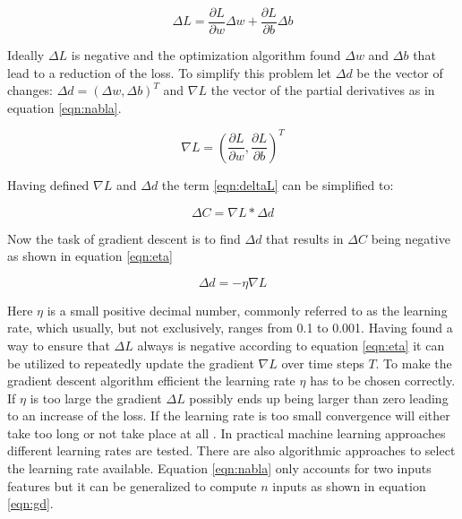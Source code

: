 \begin{equation}
  \Delta L = \frac{\partial L}{\partial w} \Delta w + \frac{\partial L}{\partial b} \Delta b
\label{eqn:deltaL} 
\end{equation}

Ideally $\Delta L$ is negative and the optimization algorithm found $\Delta w$ and
$\Delta b$ that lead to a reduction of the loss. To simplify this problem let $\Delta d$
be the vector of changes: $\Delta d = (\Delta w , \Delta b)^T $ and $\nabla L$ the vector
of the partial derivatives as in equation \ref{eqn:nabla}.


\begin{equation}
 \nabla L = \left(\frac{\partial L}{\partial w}, \frac{\partial L}{\partial b}\right)^T
\label{eqn:nabla}
\end{equation}

Having defined $\nabla L$ and $\Delta d$ the term \ref{eqn:deltaL} can be simplified to:

\begin{equation}
\Delta C = \nabla L * \Delta d
 \label{eqn:cd}
\end{equation}

Now the task of gradient descent is to find $\Delta d$ that results in $\Delta C$ being negative as
shown in equation \ref{eqn:eta}

\begin{equation}
 \Delta d = -\eta \nabla L
 \label{eqn:eta}
\end{equation}

Here $\eta$ is a small positive decimal number, commonly referred to as the learning rate,
which usually, but not exclusively, ranges from 0.1 to 0.001.  Having found a way to
ensure that $\Delta L$ always is negative according to equation \ref{eqn:eta} it can be
utilized to repeatedly update the gradient $\nabla L$ over time steps $T$. To make the
gradient descent algorithm efficient the learning rate $\eta$ has to be chosen
correctly. If $\eta$ is too large the gradient $\Delta L$ possibly ends up being larger
than zero leading to an increase of the loss. If the learning rate is too small
convergence will either take too long or not take place at all
\cite{bergstra2011algorithms}. In practical machine learning approaches different learning
rates are tested. There are also algorithmic approaches to select the learning rate
available. Equation \ref{eqn:nabla} only accounts for two inputs features but it can be
generalized to compute $n$ inputs as shown in equation \ref{eqn:gd}.

